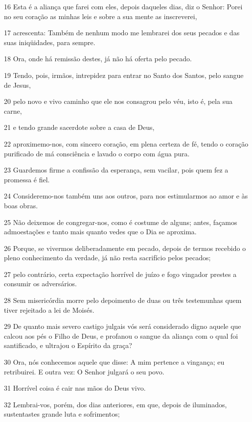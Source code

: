 \par 16 Esta é a aliança que farei com eles, depois daqueles dias, diz o Senhor: Porei no seu coração as minhas leis e sobre a sua mente as inscreverei,
\par 17 acrescenta: Também de nenhum modo me lembrarei dos seus pecados e das suas iniqüidades, para sempre.
\par 18 Ora, onde há remissão destes, já não há oferta pelo pecado.
\par 19 Tendo, pois, irmãos, intrepidez para entrar no Santo dos Santos, pelo sangue de Jesus,
\par 20 pelo novo e vivo caminho que ele nos consagrou pelo véu, isto é, pela sua carne,
\par 21 e tendo grande sacerdote sobre a casa de Deus,
\par 22 aproximemo-nos, com sincero coração, em plena certeza de fé, tendo o coração purificado de má consciência e lavado o corpo com água pura.
\par 23 Guardemos firme a confissão da esperança, sem vacilar, pois quem fez a promessa é fiel.
\par 24 Consideremo-nos também uns aos outros, para nos estimularmos ao amor e às boas obras.
\par 25 Não deixemos de congregar-nos, como é costume de alguns; antes, façamos admoestações e tanto mais quanto vedes que o Dia se aproxima.
\par 26 Porque, se vivermos deliberadamente em pecado, depois de termos recebido o pleno conhecimento da verdade, já não resta sacrifício pelos pecados;
\par 27 pelo contrário, certa expectação horrível de juízo e fogo vingador prestes a consumir os adversários.
\par 28 Sem misericórdia morre pelo depoimento de duas ou três testemunhas quem tiver rejeitado a lei de Moisés.
\par 29 De quanto mais severo castigo julgais vós será considerado digno aquele que calcou aos pés o Filho de Deus, e profanou o sangue da aliança com o qual foi santificado, e ultrajou o Espírito da graça?
\par 30 Ora, nós conhecemos aquele que disse: A mim pertence a vingança; eu retribuirei. E outra vez: O Senhor julgará o seu povo.
\par 31 Horrível coisa é cair nas mãos do Deus vivo.
\par 32 Lembrai-vos, porém, dos dias anteriores, em que, depois de iluminados, sustentastes grande luta e sofrimentos;
